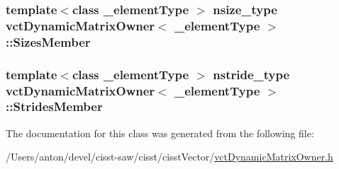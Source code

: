 \subsubsection[{Sizes\+Member}]{\setlength{\rightskip}{0pt plus 5cm}template$<$class \+\_\+element\+Type $>$ nsize\+\_\+type {\bf vct\+Dynamic\+Matrix\+Owner}$<$ \+\_\+element\+Type $>$\+::Sizes\+Member\hspace{0.3cm}{\ttfamily [protected]}}\label{classvct_dynamic_matrix_owner_a097dc19836d0b333289b633b9825d079}
\hypertarget{classvct_dynamic_matrix_owner_ab172c2ecf28deae244fb5f776dad0bef}{}
\subsubsection[{Strides\+Member}]{\setlength{\rightskip}{0pt plus 5cm}template$<$class \+\_\+element\+Type $>$ nstride\+\_\+type {\bf vct\+Dynamic\+Matrix\+Owner}$<$ \+\_\+element\+Type $>$\+::Strides\+Member\hspace{0.3cm}{\ttfamily [protected]}}\label{classvct_dynamic_matrix_owner_ab172c2ecf28deae244fb5f776dad0bef}


The documentation for this class was generated from the following file\+:\begin{DoxyCompactItemize}
\item 
/\+Users/anton/devel/cisst-\/saw/cisst/cisst\+Vector/\hyperlink{vct_dynamic_matrix_owner_8h}{vct\+Dynamic\+Matrix\+Owner.\+h}\end{DoxyCompactItemize}
